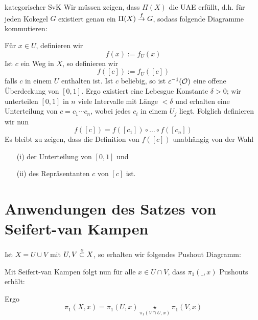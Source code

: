 \begin{Beweis}{kategorischer SvK}
Wir müssen zeigen, dass $\Pi(X)$ die UAE erfüllt, d.h. für jeden Kokegel $G$ existiert genau ein $\Pi(X) \overset{f}{\rightarrow} G$, sodass folgende Diagramme kommutieren:
\begin{center}
\end{center}

Für $x \in U$, definieren wir
\[f(x) := f_U(x)\]
Ist $c$ ein Weg in $X$, so definieren wir
\[f([c]) :=f_U([c])\]
falls $c$ in einem $U$ enthalten ist. Ist $c$ beliebig, so ist $c^{-1}(\mathcal{O})$ eine offene Überdeckung von $[0,1]$. Ergo existiert eine Lebesgue Konstante $\delta > 0$; wir unterteilen $[0,1]$ in $n$ viele Intervalle mit Länge $< \delta$ und erhalten eine Unterteilung von $c = c_1\cdots c_n$, wobei jedes $c_i$ in einem $U_j$ liegt. Folglich definieren wir nun
\[f([c]) = f([c_1]) \circ \ldots \circ f([c_n])\]
Es bleibt zu zeigen, dass die Definition von $f([c])$ unabhängig von der Wahl
\begin{enumerate}
\item[(i)] der Unterteilung von $[0,1]$ und
\item[(ii)] des Repräsentanten $c$ von $[c]$ ist.
\end{enumerate}
\end{Beweis}

\section{Anwendungen des Satzes von Seifert-van Kampen}
Ist $X = U\cup V$ mit $U, V \overset{o}{\subset} X$, so erhalten wir folgendes Pushout Diagramm:
\begin{center}
\end{center}
Mit Seifert-van Kampen folgt nun für alle $x \in U\cap V$, dass $\pi_1(\_,x)$ Pushouts erhält:
\begin{center}
\end{center}
Ergo
\[\pi_1(X,x) = \pi_1(U,x) \underset{\pi_1(V\cap U, x)}{\star} \pi_1(V,x)\]

